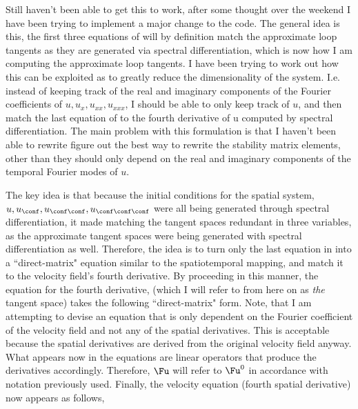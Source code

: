 Still haven't been able to get this to work, after some thought over the weekend
I have been trying to implement a major change to the code. The general idea is this,
the first three equations of  will by definition match the approximate
loop tangents as they are generated via spectral differentiation, which is now
how I am computing the approximate loop tangents. I have been trying to work out how
this can be exploited as to greatly reduce the dimensionality of the system. I.e. instead
of keeping track of the real and imaginary components of the Fourier coefficients
of $u, u_x, u_{xx}, u_{xxx}$, I should be able to only keep track of $u$, and then match
the last equation of  to the fourth derivative of u computed by spectral
differentiation. The main problem with this formulation is that I haven't been able to
rewrite figure out the best way to rewrite the stability matrix elements, other than they
should only depend on the real and imaginary components of the temporal Fourier modes of $u$.

The key idea is that because the initial conditions for the spatial system,
$u, u_{\conf}, u_{\conf \conf}, u_{\conf \conf \conf}$ were all being generated
through spectral differentiation, it made matching the tangent spaces redundant in
three variables, as the approximate tangent spaces were being generated with spectral
differentiation as well. Therefore, the idea is to turn only the last equation in
 into a ``direct-matrix"  equation similar to the spatiotemporal mapping,
and match it to the velocity field's fourth derivative.
By proceeding in this manner, the equation for the fourth derivative, (which I will
refer to from here on as \emph{the} tangent space) takes the following ``direct-matrix" form.
Note, that I am attempting to devise an equation that is only dependent on the Fourier coefficient of the
velocity field and not any of the spatial derivatives. This is acceptable because the spatial derivatives
are derived from the original velocity field anyway. What appears now in the equations are linear operators
that produce the derivatives accordingly. Therefore, $\Fu$ will refer to $\Fu^{0}$ in accordance with
notation previously used. Finally, the velocity equation (fourth spatial derivative) now appears as follows,


